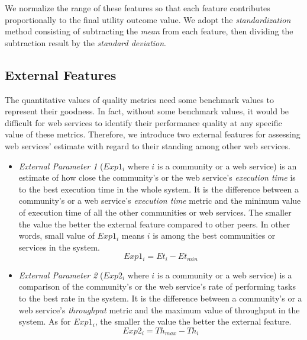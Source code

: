 \documentclass[11pt,onecolumn]{IEEEtran}
\begin{document}
	We normalize the range of these features so that each feature contributes proportionally to the final utility outcome value. We adopt the \emph{standardization} method consisting of subtracting the \emph{mean} from each feature, then dividing the subtraction result by the \emph{standard deviation}.


\subsection{External Features}\label{s:ef}

The quantitative values of quality metrics need some benchmark values to represent their goodness. In fact, without some benchmark values, it would be difficult for web services to identify their performance quality at any specific value of these metrics. Therefore, we introduce two external features for assessing web services' estimate with regard to their standing among other web services.

\begin{itemize}
  \item \emph{External Parameter 1} ($Exp1_i$ where $i$ is a community or a web service) is an estimate of how close the community's or the web service's \emph{execution time} is to the best execution time in the whole system. It is the difference between a community's or a web service's \emph{execution time} metric and the minimum value of execution time of all the other communities or web services. The smaller the value the better the external feature compared to other peers. In other words, small value of $Exp1_i$ means $i$ is among the best communities or services in the system.
	\begin{equation}\label{exp_1:f}
		Exp1_i = Et_{i} - Et_{min}
	\end{equation}
	\item \emph{External Parameter 2} ($Exp2_i$ where $i$ is a community or a web service)  is a comparison of the community's or the web service's rate of performing tasks to the best rate in the system. It is the difference between a community's or a web service's \emph{throughput} metric and the maximum value of throughput in the system. As for $Exp1_i$, the smaller the value the better the external feature.
	\begin{equation}\label{exp_2Lf}
		Exp2_i = Th_{max} - Th_{i}
	\end{equation}
\end{itemize}
\end{document}
